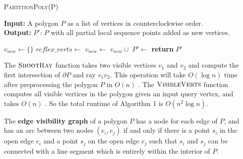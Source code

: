 \documentclass[]{styles/svproc}  %
\begin{document}
\begin{algorithm}
\caption{\textsc{PartitionPoly}(P)}
\label{algo:insert}
\hspace*{\algorithmicindent} \textbf{Input:} A polygon $P$ as a list of
vertices in counterclockwise order.\\
\hspace*{\algorithmicindent} \textbf{Output:} $P'$: $P$ with
all partial local sequence points added as new vertices.
\begin{algorithmic}[1]
\State $v_{new} \gets \{\}$
\State $reflex\_verts \gets$ 
        \State $v_{new} \gets$ $v_{new} \cup$ 
    \EndFor
\EndFor
\State $P' \gets$ 
\State \textbf{return} $P'$
\end{algorithmic}
\end{algorithm}

The $\textsc{ShootRay}$ function takes two visible vertices $v_{1}$ and $v_{2}$
and compute the first intersection of $\partial P$ and ray $v_{1}v_{2}$. This
operation will take $O(\log n)$ time after preprocessing the polygon $P$ in
$O(n)$ \cite{Szirmay-Kalos:1998:WVA:297217.297219}. The $\textsc{VisibleVerts}$
function computes all visible vertices in the polygon given an input query
vertex, and takes $O(n)$ \cite{ElGindy1981ALA}. So the total runtime of
Algorithm 1 is $O(n^2\log n)$.

\begin{definition}
The \textbf{edge visibility graph} of a polygon $P$ has a node for each edge of
$P$, and has an arc between two nodes $(e_i, e_j)$ if and only if there is a
point $s_i$ in the open edge $e_i$ and a point $s_j$ on the open edge $e_j$ such
that $s_i$ and $s_j$ can be connected with a line segment which is entirely
within the interior of $P$.
\end{definition}

%
%
%
\end{document}
